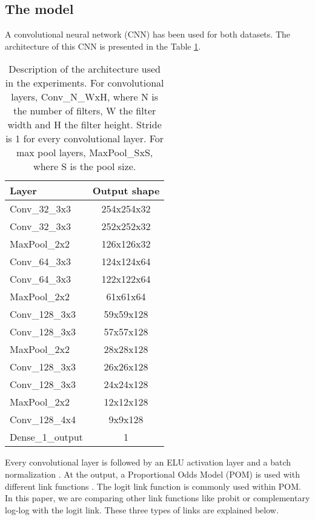 \documentclass[10pt, a4paper, titlepage, twocolumn]{article}
\begin{document}
	\subsection{The model}
	A convolutional neural network (CNN) has been used for both datasets. The architecture of this CNN is presented in the Table \ref{table:CNNArchitecture}.
	
	\begin{table}[htbp]
		\centering
		\begin{tabular}{|l|c|}
			\hline
			\textbf{Layer} & \textbf{Output shape}\\
			\hline
			Conv\_32\_3x3 & 254x254x32\\\hline
			Conv\_32\_3x3 & 252x252x32\\\hline
			MaxPool\_2x2 & 126x126x32\\\hline
			
			Conv\_64\_3x3 & 124x124x64\\\hline
			Conv\_64\_3x3 & 122x122x64\\\hline
			MaxPool\_2x2 & 61x61x64\\\hline
			
			Conv\_128\_3x3 & 59x59x128\\\hline
			Conv\_128\_3x3 & 57x57x128\\\hline
			MaxPool\_2x2 & 28x28x128\\\hline
			
			Conv\_128\_3x3 & 26x26x128\\\hline
			Conv\_128\_3x3 & 24x24x128\\\hline
			MaxPool\_2x2 & 12x12x128\\\hline
			
			Conv\_128\_4x4 & 9x9x128\\\hline
			Dense\_1\_output & 1\\
			\hline
		\end{tabular}
		\caption{Description of the architecture used in the experiments. For convolutional layers, Conv\_N\_WxH, where N is the number of filters, W the filter width and H the filter height. Stride is 1 for every convolutional layer. For max pool layers, MaxPool\_SxS, where S is the pool size.}
		\label{table:CNNArchitecture}
	\end{table}
	
	Every convolutional layer is followed by an ELU activation layer \cite{clevert2015fast} and a batch normalization \cite{ioffe2015batch}. At the output, a Proportional Odds Model (POM) is used with different link functions \cite{agresti2010analysis}. The logit link function is commonly used within POM. In this paper, we are comparing other link functions like probit or complementary log-log with the logit link. These three types of links are explained below.
	
\end{document}
